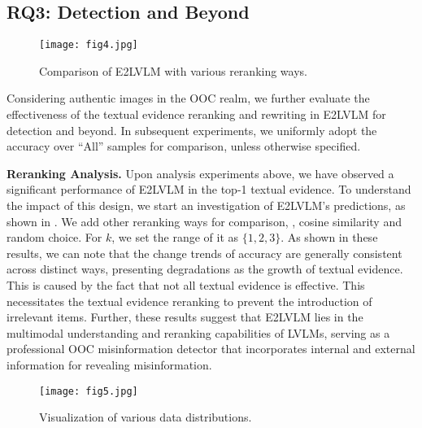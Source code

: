 \subsection{RQ3: Detection and Beyond}


\begin{figure}[t]
  \centering
   \texttt{[image: fig4.jpg]}
   \caption{Comparison of E2LVLM with various reranking ways.}
   \label{fig:4}
\end{figure}



Considering authentic images in the OOC realm, we further evaluate the effectiveness of the textual evidence reranking and rewriting in E2LVLM for detection and beyond. In subsequent experiments, we uniformly adopt the accuracy over ``All'' samples for comparison, unless otherwise specified.

\noindent \textbf{Reranking Analysis.} Upon analysis experiments above, we have observed a significant performance of E2LVLM in the top-1 textual evidence. To understand the impact of this design, we start an investigation of E2LVLM's predictions, as shown in . We add other reranking ways for comparison, \ie, cosine similarity and random choice. For $k$, we set the range of it as $\{1,2,3\}$. As shown in these results, we can note that the change trends of accuracy are generally consistent across distinct ways, presenting degradations as the growth of textual evidence. This is caused by the fact that not all textual evidence is effective. This necessitates the textual evidence reranking to prevent the introduction of irrelevant items. Further, these results suggest that E2LVLM lies in the multimodal understanding and reranking capabilities of LVLMs, serving as a professional OOC misinformation detector that incorporates internal and external information for revealing misinformation.

\begin{figure}[t]
  \centering
   \texttt{[image: fig5.jpg]}
   \caption{Visualization of various data distributions.}
   \label{fig:5}
\end{figure}

